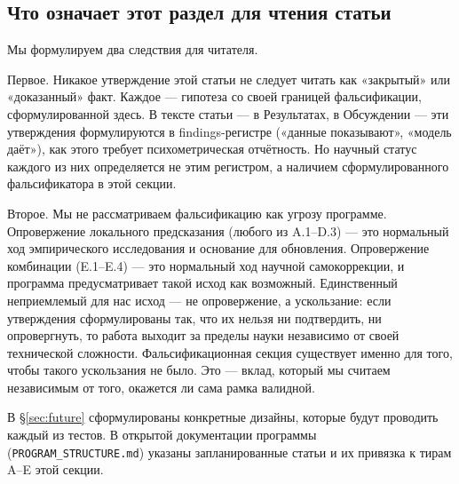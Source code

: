 \subsection{Что означает этот раздел для чтения статьи}
\label{subsec:falsification_closing}

Мы формулируем два следствия для читателя.

Первое. Никакое утверждение этой статьи не следует читать как «закрытый» или «доказанный» факт. Каждое --- гипотеза со своей границей фальсификации, сформулированной здесь. В тексте статьи --- в Результатах, в Обсуждении --- эти утверждения формулируются в findings-регистре («данные показывают», «модель даёт»), как этого требует психометрическая отчётность. Но научный статус каждого из них определяется не этим регистром, а наличием сформулированного фальсификатора в этой секции.

Второе. Мы не рассматриваем фальсификацию как угрозу программе. Опровержение локального предсказания (любого из A.1--D.3) --- это нормальный ход эмпирического исследования и основание для обновления. Опровержение комбинации (E.1--E.4) --- это нормальный ход научной самокоррекции, и программа предусматривает такой исход как возможный. Единственный неприемлемый для нас исход --- не опровержение, а ускользание: если утверждения сформулированы так, что их нельзя ни подтвердить, ни опровергнуть, то работа выходит за пределы науки независимо от своей технической сложности. Фальсификационная секция существует именно для того, чтобы такого ускользания не было. Это --- вклад, который мы считаем независимым от того, окажется ли сама рамка валидной.

В §\ref{sec:future} сформулированы конкретные дизайны, которые будут проводить каждый из тестов. В открытой документации программы (\texttt{PROGRAM\_STRUCTURE.md}) указаны запланированные статьи и их привязка к тирам A--E этой секции.
